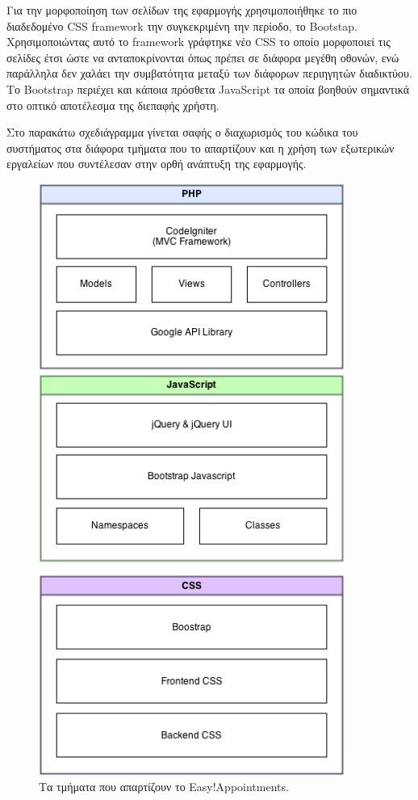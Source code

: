Για την μορφοποίηση των σελίδων της εφαρμογής χρησιμοποιήθηκε το πιο διαδεδομένο CSS framework την συγκεκριμένη την περίοδο, το Bootstap. Χρησιμοποιώντας αυτό το framework γράφτηκε νέο CSS το οποίο μορφοποιεί τις σελίδες έτσι ώστε να ανταποκρίνονται όπως πρέπει σε διάφορα μεγέθη οθονών, ενώ παράλληλα δεν χαλάει την συμβατότητα μεταξύ των διάφορων περιηγητών διαδικτύου. Το Bootstrap περιέχει και κάποια πρόσθετα JavaScript τα οποία βοηθούν σημαντικά στο οπτικό αποτέλεσμα της διεπαφής χρήστη.

Στο παρακάτω σχεδιάγραμμα γίνεται σαφής ο διαχωρισμός του κώδικα του συστήματος στα διάφορα τμήματα που το απαρτίζουν και η χρήση των εξωτερικών εργαλείων που συντέλεσαν στην ορθή ανάπτυξη της εφαρμογής.

\begin{figure}[ht!]
\centering
\includegraphics[width=100mm]{images/system-architecture.png}
\caption{Τα τμήματα που απαρτίζουν το Easy!Appointments.}
\label{system-architecture}
\end{figure}

